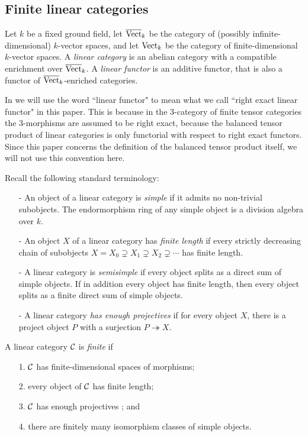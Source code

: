 \documentclass{amsart}
\begin{document}
\subsection{Finite linear categories}

	Let $k$ be a fixed ground field, let $\overline{\mathrm{Vect}}_k$ be the category of (possibly infinite-dimensional) $k$-vector spaces, and let $\mathrm{Vect}_k$ be the category of finite-dimensional $k$-vector spaces.   A {\em linear category} is an abelian category with a compatible enrichment over $\overline{\mathrm{Vect}}_k$. 
A {\em linear functor} is an additive functor, that is also a functor of $\overline{\mathrm{Vect}}_k$-enriched categories. 

\begin{warning}
	In \cite{3TC, DTCI} we will use the word ``linear functor" to mean what we call ``right exact linear functor" in this paper.  This is because in the $3$-category of finite tensor categories the $3$-morphisms are assumed to be right exact, because the balanced tensor product of linear categories is only functorial with respect to right exact functors.  Since this paper concerns the definition of the balanced tensor product itself, we will not use this convention here.
\end{warning}

Recall the following standard terminology:
\begin{itemize}
	\item[-] An object of a linear category is {\em simple} if it admits no non-trivial subobjects. The endormorphism ring of any simple object is a division algebra over $k$. 
	\item[-] An object $X$ of a linear category has {\em finite length} if every strictly decreasing chain of subobjects $X = X_0 \supsetneq X_1 \supsetneq X_2 \supsetneq  \cdots$ has finite length. 
	\item[-] A linear category is {\em semisimple} if every object splits as a direct sum of simple objects. If in addition every object has finite length, then every object splits as a finite direct sum of simple objects.
	\item[-] A linear category {\em has enough projectives} if for every object $X$, there is a project object $P$ with a surjection $P \twoheadrightarrow X$. 
\end{itemize}


\begin{definition} %
	A linear category $\mathcal C$ is {\em finite} if 
	\begin{enumerate}
		\item[1.] $\mathcal C$ has finite-dimensional spaces of morphisms;
		\item[2.] every object of $\mathcal C$ has finite length;
		\item[3.] $\mathcal C$ has enough projectives%
		; and
		\item[4.] there are finitely many isomorphism classes of simple objects.  
	\end{enumerate}
\end{definition}
\end{document}

